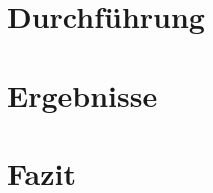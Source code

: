 \documentclass[a4paper, 11pt, oneside]{Thesis}  %
\renewcommand{\bibname}{Literaturverzeichnis}
\begin{document}
\chapter{Durchführung}


\chapter{Ergebnisse}


%

\chapter{Fazit}


\renewcommand{\bibname}{Literaturverzeichnis}

\end{document}
